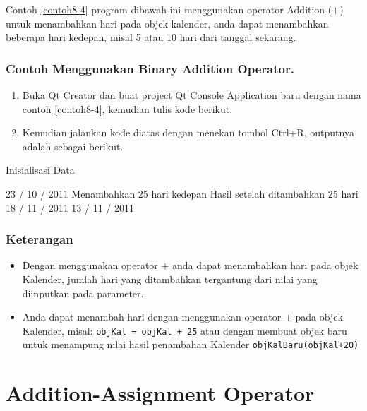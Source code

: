 Contoh \ref{contoh8-4} program dibawah ini menggunakan operator Addition (+) untuk
menambahkan hari pada objek kalender, anda dapat menambahkan beberapa
hari kedepan, misal 5 atau 10 hari dari tanggal sekarang.

\subsubsection*{Contoh Menggunakan Binary Addition Operator.}

\begin{enumerate}

\item
 Buka Qt Creator dan buat project Qt Console Application baru dengan
 nama contoh \ref{contoh8-4}, kemudian tulis kode berikut.



\item
 Kemudian jalankan kode diatas dengan menekan tombol Ctrl+R, outputnya
 adalah sebagai berikut.
\end{enumerate}

\begin{lcverbatim}
Inisialisasi Data

23 / 10 / 2011 Menambahkan 25 hari kedepan
Hasil setelah ditambahkan 25 hari 18 / 11 / 2011
13 / 11 / 2011
\end{lcverbatim}

\subsubsection*{Keterangan}

\begin{itemize}

\item
 Dengan menggunakan operator + anda dapat menambahkan hari pada objek
 Kalender, jumlah hari yang ditambahkan tergantung dari nilai yang
 diinputkan pada parameter.
\item
 Anda dapat menambah hari dengan menggunakan operator + pada objek
 Kalender, misal: \texttt{objKal\ =\ objKal\ +\ 25} atau dengan membuat
 objek baru untuk menampung nilai hasil penambahan Kalender
 \texttt{objKalBaru(objKal+20)}
\end{itemize}

\section{Addition-Assignment
Operator}\label{addition-assignment-operator}

